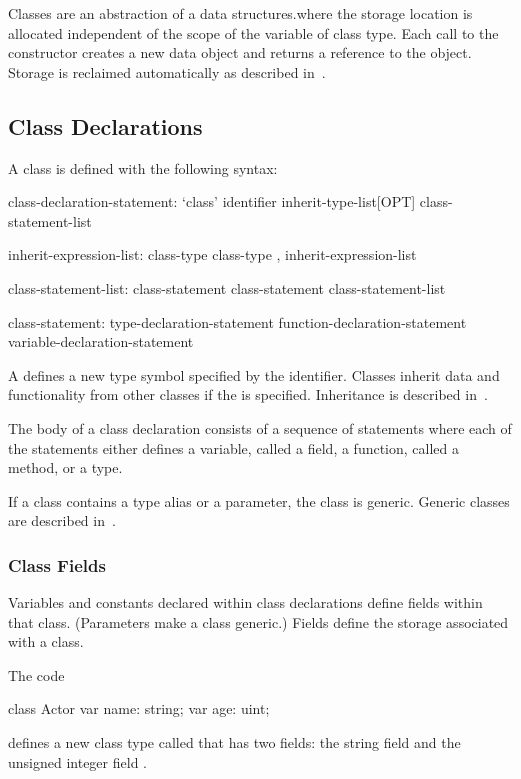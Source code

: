 \label{Classes}

Classes are an abstraction of a data structures.where the storage
location is allocated independent of the scope of the variable of
class type.  Each call to the constructor creates a new data object
and returns a reference to the object.  Storage is reclaimed
automatically as described in~.

\subsection{Class Declarations}
\label{Class_Declarations}

A class is defined with the following syntax:
\begin{syntax}
class-declaration-statement:
  `class' identifier inherit-type-list[OPT] {
    class-statement-list }

inherit-expression-list:
  class-type
  class-type , inherit-expression-list

class-statement-list:
  class-statement
  class-statement class-statement-list

class-statement:
  type-declaration-statement
  function-declaration-statement
  variable-declaration-statement
\end{syntax}
A  defines a new type symbol
specified by the identifier.  Classes inherit data and functionality
from other classes if the  is specified.
Inheritance is described in~.

The body of a class declaration consists of a sequence of statements
where each of the statements either defines a variable, called a
field, a function, called a method, or a type.

If a class contains a type alias or a parameter, the class is generic.
Generic classes are described in~.

\subsubsection{Class Fields}
\label{Class_Fields}

Variables and constants declared within class declarations define
fields within that class.  (Parameters make a class generic.)  Fields
define the storage associated with a class.

\begin{example}
The code
\begin{chapel}
class Actor {
  var name: string;
  var age: uint;
}
\end{chapel}
defines a new class type called  that has two fields: the
string field  and the unsigned integer field .
\end{example}

